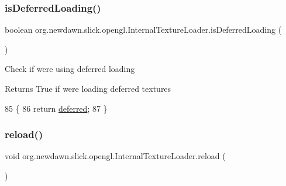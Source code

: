 \subsubsection{\texorpdfstring{is\+Deferred\+Loading()}{isDeferredLoading()}}
{\footnotesize\ttfamily boolean org.\+newdawn.\+slick.\+opengl.\+Internal\+Texture\+Loader.\+is\+Deferred\+Loading (\begin{DoxyParamCaption}{ }\end{DoxyParamCaption})\hspace{0.3cm}{\ttfamily [inline]}}

Check if we\textquotesingle{}re using deferred loading

\begin{DoxyReturn}{Returns}
True if we\textquotesingle{}re loading deferred textures 
\end{DoxyReturn}

\begin{DoxyCode}
85                                        \{
86         \textcolor{keywordflow}{return} \mbox{\hyperlink{classorg_1_1newdawn_1_1slick_1_1opengl_1_1_internal_texture_loader_afde58d084fb7c587c15b674005617ff4}{deferred}};
87     \}
\end{DoxyCode}
\mbox{\label{classorg_1_1newdawn_1_1slick_1_1opengl_1_1_internal_texture_loader_a104bc76d2e57c583fb713651a08f69a1}} 
\subsubsection{\texorpdfstring{reload()}{reload()}\hspace{0.1cm}{\footnotesize\ttfamily [1/2]}}
{\footnotesize\ttfamily void org.\+newdawn.\+slick.\+opengl.\+Internal\+Texture\+Loader.\+reload (\begin{DoxyParamCaption}{ }\end{DoxyParamCaption})\hspace{0.3cm}{\ttfamily [inline]}}

